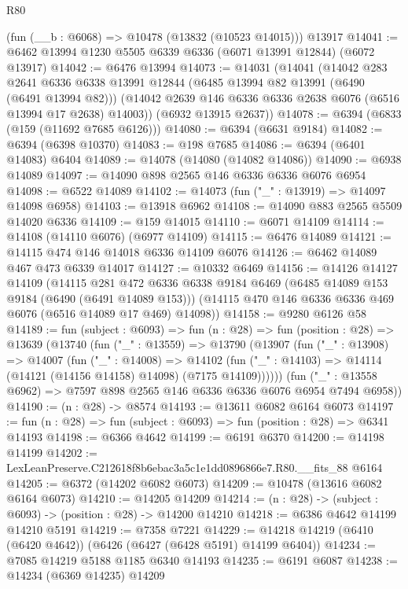\begin{lexlean}{R80}
\begin{coremodule}
    (fun (__b : @6068) => @10478 (@13832 (@10523 @14015)))
    @13917
@14041 := @6462 @13994 @1230 @5505 @6339 @6336 (@6071 @13991 @12844) (@6072 @13917)
@14042 := @6476 @13994
@14073 := @14031
    (@14041
      (@14042
        @283
        @2641
        @6336
        @6338
        @13991
        @12844
        (@6485 @13994 @82 @13991 (@6490 (@6491 @13994 @82)))
        (@14042 @2639 @146 @6336 @6336 @2638 @6076 (@6516 @13994 @17 @2638) @14003))
      (@6932 @13915 @2637))
@14078 := @6394 (@6833 (@159 (@11692 @7685 @6126)))
@14080 := @6394 (@6631 @9184)
@14082 := @6394 (@6398 @10370)
@14083 := @198 @7685
@14086 := @6394 (@6401 @14083) @6404
@14089 := @14078 (@14080 (@14082 @14086))
@14090 := @6938 @14089
@14097 := @14090 @898 @2565 @146 @6336 @6336 @6076 @6954
@14098 := @6522 @14089
@14102 := @14073 (fun ("_" : @13919) => @14097 @14098 @6958)
@14103 := @13918 @6962
@14108 := @14090 @883 @2565 @5509 @14020 @6336
@14109 := @159 @14015
@14110 := @6071 @14109
@14114 := @14108 (@14110 @6076) (@6977 @14109)
@14115 := @6476 @14089
@14121 := @14115 @474 @146 @14018 @6336 @14109 @6076
@14126 := @6462 @14089 @467 @473 @6339 @14017
@14127 := @10332 @6469
@14156 := @14126
    @14127
    @14109
    (@14115
      @281
      @472
      @6336
      @6338
      @9184
      @6469
      (@6485 @14089 @153 @9184 (@6490 (@6491 @14089 @153)))
      (@14115 @470 @146 @6336 @6336 @469 @6076 (@6516 @14089 @17 @469) @14098))
@14158 := @9280 @6126 @58
@14189 := fun (subject : @6093) =>
  fun (n : @28) =>
  fun (position : @28) =>
  @13639
    (@13740
      (fun ("_" : @13559) =>
      @13790
        (@13907
          (fun ("_" : @13908) =>
          @14007
            (fun ("_" : @14008) =>
            @14102 (fun ("_" : @14103) => @14114 (@14121 (@14156 @14158) @14098) (@7175 @14109))))))
      (fun ("_" : @13558 @6962) => @7597 @898 @2565 @146 @6336 @6336 @6076 @6954 @7494 @6958))
@14190 := (n : @28) -> @8574
@14193 := @13611 @6082 @6164 @6073
@14197 := fun (n : @28) => fun (subject : @6093) => fun (position : @28) => @6341 @14193
@14198 := @6366 @4642
@14199 := @6191 @6370
@14200 := @14198 @14199
@14202 := LexLeanPreserve.C212618f8b6ebac3a5c1e1dd0896866e7.R80.__fits_88 @6164
@14205 := @6372 (@14202 @6082 @6073)
@14209 := @10478 (@13616 @6082 @6164 @6073)
@14210 := @14205 @14209
@14214 := (n : @28) -> (subject : @6093) -> (position : @28) -> @14200 @14210
@14218 := @6386 @4642 @14199 @14210 @5191
@14219 := @7358 @7221
@14229 := @14218 @14219 (@6410 (@6420 @4642)) (@6426 (@6427 (@6428 @5191) @14199 @6404))
@14234 := @7085 @14219 @5188 @1185 @6340 @14193
@14235 := @6191 @6087
@14238 := @14234 (@6369 @14235) @14209

\end{coremodule}
\end{lexlean}
